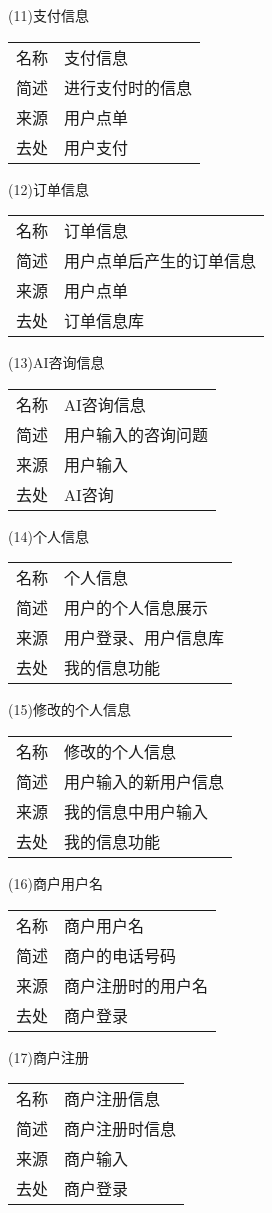 (11)支付信息

\begin{longtable}[]{@{}ll@{}}
\toprule
名称 & 支付信息\tabularnewline
简述 & 进行支付时的信息\tabularnewline
来源 & 用户点单\tabularnewline
去处 & 用户支付\tabularnewline
\bottomrule
\end{longtable}

(12)订单信息

\begin{longtable}[]{@{}ll@{}}
\toprule
名称 & 订单信息\tabularnewline
简述 & 用户点单后产生的订单信息\tabularnewline
来源 & 用户点单\tabularnewline
去处 & 订单信息库\tabularnewline
\bottomrule
\end{longtable}

(13)AI咨询信息

\begin{longtable}[]{@{}ll@{}}
\toprule
名称 & AI咨询信息\tabularnewline
简述 & 用户输入的咨询问题\tabularnewline
来源 & 用户输入\tabularnewline
去处 & AI咨询\tabularnewline
\bottomrule
\end{longtable}

(14)个人信息

\begin{longtable}[]{@{}ll@{}}
\toprule
名称 & 个人信息\tabularnewline
简述 & 用户的个人信息展示\tabularnewline
来源 & 用户登录、用户信息库\tabularnewline
去处 & 我的信息功能\tabularnewline
\bottomrule
\end{longtable}

(15)修改的个人信息

\begin{longtable}[]{@{}ll@{}}
\toprule
名称 & 修改的个人信息\tabularnewline
简述 & 用户输入的新用户信息\tabularnewline
来源 & 我的信息中用户输入\tabularnewline
去处 & 我的信息功能\tabularnewline
\bottomrule
\end{longtable}

(16)商户用户名

\begin{longtable}[]{@{}ll@{}}
\toprule
名称 & 商户用户名\tabularnewline
简述 & 商户的电话号码\tabularnewline
来源 & 商户注册时的用户名\tabularnewline
去处 & 商户登录\tabularnewline
\bottomrule
\end{longtable}

(17)商户注册

\begin{longtable}[]{@{}ll@{}}
\toprule
名称 & 商户注册信息\tabularnewline
简述 & 商户注册时信息\tabularnewline
来源 & 商户输入\tabularnewline
去处 & 商户登录\tabularnewline
\bottomrule
\end{longtable}

